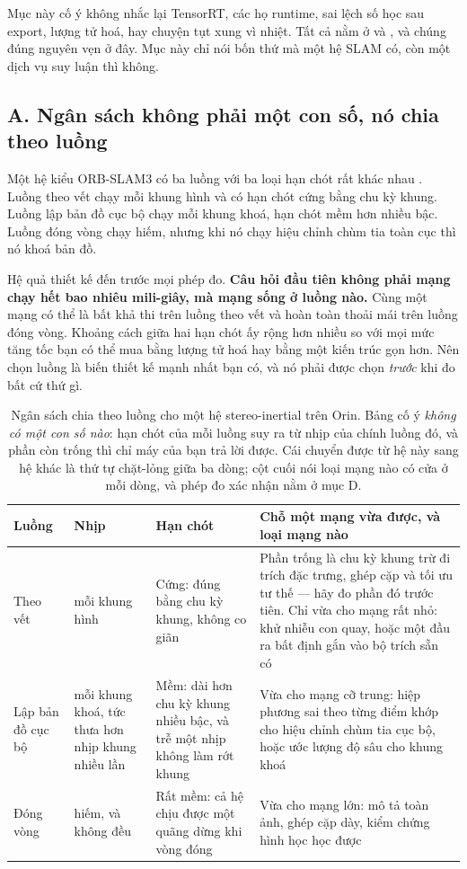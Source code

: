 \documentclass[../../deep_learning.tex]{subfiles}
\begin{document}
Mục này cố ý không nhắc lại TensorRT, các họ runtime, sai lệch số học sau export, lượng tử hoá, hay chuyện tụt xung vì nhiệt. Tất cả nằm ở  và , và chúng đúng nguyên vẹn ở đây. Mục này chỉ nói bốn thứ mà một hệ SLAM có, còn một dịch vụ suy luận thì không.

\subsection{A. Ngân sách không phải một con số, nó chia theo luồng}

Một hệ kiểu ORB-SLAM3 có ba luồng với ba loại hạn chót rất khác nhau \cite{campos2021orbslam3}. Luồng theo vết chạy mỗi khung hình và có hạn chót cứng bằng chu kỳ khung. Luồng lập bản đồ cục bộ chạy mỗi khung khoá, hạn chót mềm hơn nhiều bậc. Luồng đóng vòng chạy hiếm, nhưng khi nó chạy hiệu chỉnh chùm tia toàn cục thì nó khoá bản đồ.

Hệ quả thiết kế đến trước mọi phép đo. \textbf{Câu hỏi đầu tiên không phải mạng chạy hết bao nhiêu mili-giây, mà mạng sống ở luồng nào.} Cùng một mạng có thể là bất khả thi trên luồng theo vết và hoàn toàn thoải mái trên luồng đóng vòng. Khoảng cách giữa hai hạn chót ấy rộng hơn nhiều so với mọi mức tăng tốc bạn có thể mua bằng lượng tử hoá hay bằng một kiến trúc gọn hơn. Nên chọn luồng là biến thiết kế mạnh nhất bạn có, và nó phải được chọn \emph{trước} khi đo bất cứ thứ gì.

\begin{table}[H]\centering\footnotesize
\caption{Ngân sách chia theo luồng cho một hệ stereo-inertial trên Orin. Bảng cố ý \emph{không có một con số nào}: hạn chót của mỗi luồng suy ra từ nhịp của chính luồng đó, và phần còn trống thì chỉ máy của bạn trả lời được. Cái chuyển được từ hệ này sang hệ khác là thứ tự chặt-lỏng giữa ba dòng; cột cuối nói loại mạng nào có cửa ở mỗi dòng, và phép đo xác nhận nằm ở mục D.}
\label{tab:f34-ngan-sach}
\begin{tabularx}{\linewidth}{@{}L{2.6cm}L{2.6cm}L{2.8cm}Y@{}}
\toprule
\textbf{Luồng} & \textbf{Nhịp} & \textbf{Hạn chót} & \textbf{Chỗ một mạng vừa được, và loại mạng nào}\\
\midrule
Theo vết & mỗi khung hình & Cứng: đúng bằng chu kỳ khung, không co giãn & Phần trống là chu kỳ khung trừ đi trích đặc trưng, ghép cặp và tối ưu tư thế --- hãy đo phần đó trước tiên. Chỉ vừa cho mạng rất nhỏ: khử nhiễu con quay, hoặc một đầu ra bất định gắn vào bộ trích sẵn có\\
Lập bản đồ cục bộ & mỗi khung khoá, tức thưa hơn nhịp khung nhiều lần & Mềm: dài hơn chu kỳ khung nhiều bậc, và trễ một nhịp không làm rớt khung & Vừa cho mạng cỡ trung: hiệp phương sai theo từng điểm khớp cho hiệu chỉnh chùm tia cục bộ, hoặc ước lượng độ sâu cho khung khoá\\
Đóng vòng & hiếm, và không đều & Rất mềm: cả hệ chịu được một quãng dừng khi vòng đóng & Vừa cho mạng lớn: mô tả toàn ảnh, ghép cặp dày, kiểm chứng hình học học được\\
\bottomrule
\end{tabularx}
\end{table}
\end{document}
